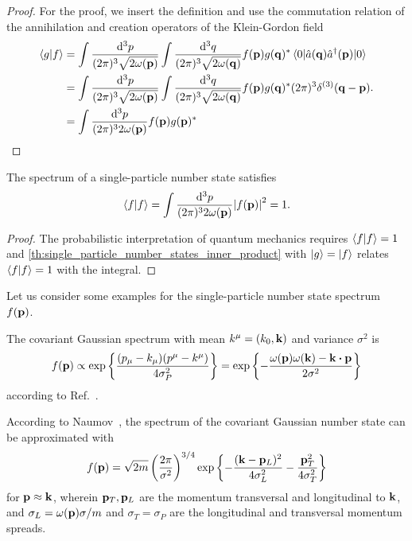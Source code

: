 \begin{proof}
	For the proof, we insert the definition and use the commutation relation of the annihilation and creation operators of the Klein-Gordon field
	\begin{equation}
		\begin{split}
			\bra{g}\ket{f}
			&=
			\int\frac{\dd[3]{p}}{(2\pi)^3\sqrt{2\omega(\vb{p})}}
			\int\frac{\dd[3]{q}}{(2\pi)^3\sqrt{2\omega(\vb{q})}}
			f(\vb{p})g(\vb{q})^*
			\expval{\hat{a}(\vb{q})\hat{a}^\dagger(\vb{p})}{0}
			\\
			&=
			\int\frac{\dd[3]{p}}{(2\pi)^3\sqrt{2\omega(\vb{p})}}
			\int\frac{\dd[3]{q}}{(2\pi)^3\sqrt{2\omega(\vb{q})}}
			f(\vb{p})g(\vb{q})^*
			(2\pi)^3\delta^{(3)}(\vb{q}-\vb{p})
			\\
			&=
			\int\frac{\dd[3]{p}}{(2\pi)^32\omega(\vb{p})}
			f(\vb{p})g(\vb{p})^*
		\end{split}
		.
	\end{equation}
\end{proof}
\begin{lemma}
	The spectrum of a single-particle number state satisfies
	\begin{equation}
		\bra{f}\ket{f}
		=
		\int\frac{\dd[3]{p}}{(2\pi)^32\omega(\vb{p})}
		\abs{f(\vb{p})}^2
		=
		1
		.
	\end{equation}
\end{lemma}
\begin{proof}
	The probabilistic interpretation of quantum mechanics requires $\braket{f}=1$ and \cref{th:single_particle_number_states_inner_product} with $\ket{g}=\ket{f}$ relates $\braket{f}=1$ with the integral.
\end{proof}
Let us consider some examples for the single-particle number state spectrum $f(\vb{p})$.
\begin{example}
	The covariant Gaussian spectrum with mean $k^\mu=(k_0,\vb{k})$ and variance $\sigma^2$ is
	\begin{equation}
		f(\vb{p})
		\propto
		\exp\left\{
			\frac{(p_\mu-k_\mu)(p^\mu-k^\mu)}{4\sigma_P^2}
		\right\}
		=
		\exp\left\{
			-
			\frac{\omega(\vb{p})\omega(\vb{k})-\vb{k}\vdot\vb{p}}{2\sigma^2}
		\right\}
		\label{eq:covariant_gaussian_spectrum}
	\end{equation}
	according to Ref.~\cite{Naumov2013,Naumov2009}.
\end{example}
\begin{example}
	According to Naumov~\cite{Naumov2013}, the spectrum of the covariant Gaussian number state can be approximated with
	\begin{equation}
		f(\vb{p})
		=
		\sqrt{2m}
		\left(
			\frac{2\pi}{\sigma^2}
		\right)^{3/4}
		\exp\left\{
			-
			\frac{(\vb{k}-\vb{p}_L)^2}{4\sigma_L^2}
			-
			\frac{\vb{p}_T^2}{4\sigma_T^2}
		\right\}
	\end{equation}
	for $\vb{p}\approx\vb{k}$, wherein $\vb{p}_T,\vb{p}_L$ are the momentum transversal and longitudinal to $\vb{k}$, and $\sigma_L=\omega(\vb{p})\sigma/m$ and $\sigma_T=\sigma_P$ are the longitudinal and transversal momentum spreads.
\end{example}

